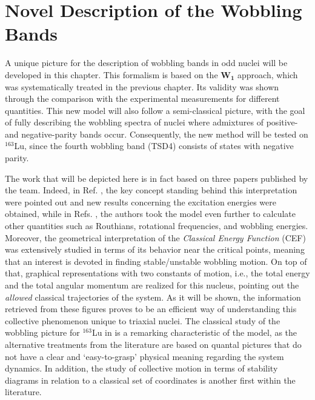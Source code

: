 \chapter{Novel Description of the Wobbling Bands}
\label{chapter-5-novel} %

A unique picture for the description of wobbling bands in odd nuclei will be developed in this chapter. This formalism is based on the $\mathbf{W_1}$ approach, which was systematically treated in the previous chapter. Its validity was shown through the comparison with the experimental measurements for different quantities. This new model will also follow a semi-classical picture, with the goal of fully describing the wobbling spectra of nuclei where admixtures of positive- and negative-parity bands occur. Consequently, the new method will be tested on $^{163}$Lu, since the fourth wobbling band (TSD4) consists of states with negative parity.

The work that will be depicted here is in fact based on three papers published by the team. Indeed, in Ref. \cite{poenaru2021parity}, the key concept standing behind this interpretation were pointed out and new results concerning the excitation energies were obtained, while in Refs. \cite{poenaru2021extensive1,poenaru2021extensive2}, the authors took the model even further to calculate other quantities such as Routhians, rotational frequencies, and wobbling energies. Moreover, the geometrical interpretation of the \emph{Classical Energy Function} (CEF) was extensively studied in terms of its behavior near the critical points, meaning that an interest is devoted in finding stable/unstable wobbling motion. On top of that, graphical representations with two constants of motion, i.e., the total energy and the total angular momentum are realized for this nucleus, pointing out the \emph{allowed} classical trajectories of the system. As it will be shown, the information retrieved from these figures proves to be an efficient way of understanding this collective phenomenon unique to triaxial nuclei. The classical study of the wobbling picture for $^{163}$Lu in \cite{poenaru2021extensive2} is a remarking characteristic of the model, as the alternative treatments from the literature are based on quantal pictures that do not have a clear and `easy-to-grasp' physical meaning regarding the system dynamics. In addition, the study of collective motion in terms of stability diagrams in relation to a classical set of coordinates is another first within the literature.

